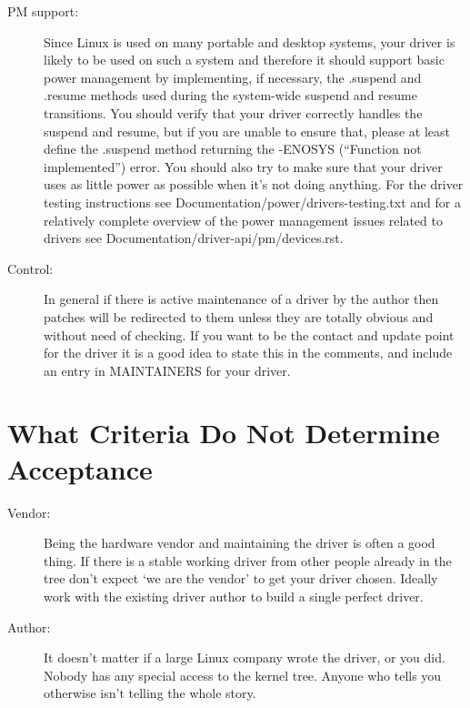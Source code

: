 \documentclass[a4paper,8pt,english]{sphinxmanual}
\begin{document}
\begin{description}
\item[{PM support:}] \leavevmode
Since Linux is used on many portable and desktop systems, your
driver is likely to be used on such a system and therefore it
should support basic power management by implementing, if
necessary, the .suspend and .resume methods used during the
system-wide suspend and resume transitions.  You should verify
that your driver correctly handles the suspend and resume, but
if you are unable to ensure that, please at least define the
.suspend method returning the -ENOSYS (``Function not
implemented'') error.  You should also try to make sure that your
driver uses as little power as possible when it's not doing
anything.  For the driver testing instructions see
Documentation/power/drivers-testing.txt and for a relatively
complete overview of the power management issues related to
drivers see Documentation/driver-api/pm/devices.rst.

\item[{Control:}] \leavevmode
In general if there is active maintenance of a driver by
the author then patches will be redirected to them unless
they are totally obvious and without need of checking.
If you want to be the contact and update point for the
driver it is a good idea to state this in the comments,
and include an entry in MAINTAINERS for your driver.

\end{description}


\section{What Criteria Do Not Determine Acceptance}
\label{process/submitting-drivers:what-criteria-do-not-determine-acceptance}\begin{description}
\item[{Vendor:}] \leavevmode
Being the hardware vendor and maintaining the driver is
often a good thing. If there is a stable working driver from
other people already in the tree don't expect `we are the
vendor' to get your driver chosen. Ideally work with the
existing driver author to build a single perfect driver.

\item[{Author:}] \leavevmode
It doesn't matter if a large Linux company wrote the driver,
or you did. Nobody has any special access to the kernel
tree. Anyone who tells you otherwise isn't telling the
whole story.

\end{description}
\end{document}
